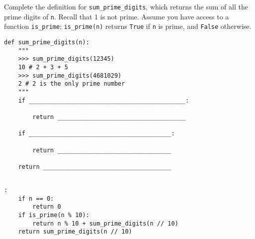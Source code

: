\begin{blocksection}
\question Complete the definition for \lstinline{sum_prime_digits}, which returns the sum of all the prime digits of \lstinline{n}. Recall that 1 is not prime. Assume you have access to a function \lstinline{is_prime}; \lstinline{is_prime(n)} returns \lstinline{True} if \lstinline{n} is prime, and \lstinline{False} otherwise. 

\begin{lstlisting}
def sum_prime_digits(n):
    """
    >>> sum_prime_digits(12345)
    10 # 2 + 3 + 5
    >>> sum_prime_digits(4681029)
    2 # 2 is the only prime number
    """
    if ____________________________________________:		

        return ____________________________________	

    if ________________________________________:		

        return ________________________________				

    return ____________________________________
				
\end{lstlisting}

\begin{solution}[1in]
\begin{lstlisting}:
    if n == 0:
        return 0
    if is_prime(n % 10):
        return n % 10 + sum_prime_digits(n // 10)
    return sum_prime_digits(n // 10)
\end{lstlisting}
\end{solution}
\end{blocksection}
